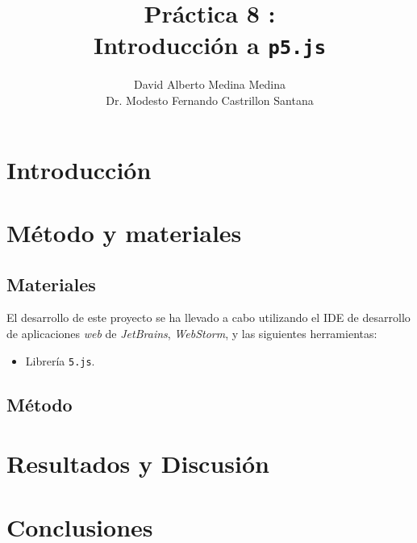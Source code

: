 \documentclass[10pt,a4paper]{report}
\author{David Alberto Medina Medina
	\\
	Dr. Modesto Fernando Castrillon Santana}
\title{Práctica 8 :\\ Introducción a \texttt{p5.js}}
\begin{document}
	\maketitle
	\tableofcontents
	
	\chapter{Introducción}
	
	
	\chapter{Método y materiales}
	\section{Materiales}
	El desarrollo de este proyecto se ha llevado a cabo utilizando el IDE de desarrollo de aplicaciones \textit{web} de \textit{JetBrains}, \textit{WebStorm}, y las siguientes herramientas:
	\begin{itemize}
		\item Librería \texttt{5.js}.
	\end{itemize}
	
	\section{Método}
	
	
	\chapter{Resultados y Discusión}
	
		
	
	\chapter{Conclusiones}	
	
	
	
\end{document}
